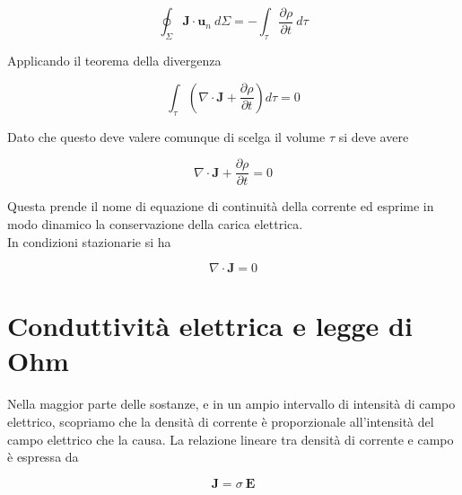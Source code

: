 \begin{equation}
    \oint_{\Sigma} \mathbf{J} \cdot \mathbf{u}_n \ d\Sigma = - \int_{\tau} \frac{\partial \rho}{\partial t} \ d \tau
\end{equation}

Applicando il teorema della divergenza 

\begin{equation}
    \int_{\tau} \left( \nabla \cdot \mathbf{J} + \frac{\partial \rho}{\partial t} \right) d \tau = 0
\end{equation}

Dato che questo deve valere comunque di scelga il volume $\tau$ si deve avere 

\begin{tcolorbox}[colback=yellow!10!white, colframe=orange!70!black, boxrule=0.8pt]
\begin{equation} \label{eq:equazione_continuità}
    \nabla \cdot \mathbf{J} + \frac{\partial \rho}{\partial t} = 0
\end{equation}
\end{tcolorbox}

Questa  prende il nome di equazione di continuità della corrente ed esprime in modo dinamico la conservazione della carica elettrica.\\

In condizioni stazionarie si ha 

\begin{tcolorbox}[colback=yellow!10!white, colframe=orange!70!black, boxrule=0.8pt]
\begin{equation}
    \nabla \cdot \mathbf{J} = 0
\end{equation}
\end{tcolorbox}

\section{Conduttività elettrica e legge di Ohm}

Nella maggior parte delle sostanze, e in un ampio intervallo di intensità di campo elettrico, scopriamo che la densità di corrente è proporzionale all'intensità del campo elettrico che la causa. La relazione lineare tra densità di corrente e campo è espressa da

\begin{tcolorbox}[colback=yellow!10!white, colframe=orange!70!black, boxrule=0.8pt]
\begin{equation}
    \mathbf{J} = \sigma \ \mathbf{E}
    \label{eq:Legge_Ohm_conduzione}
\end{equation}
\end{tcolorbox}

